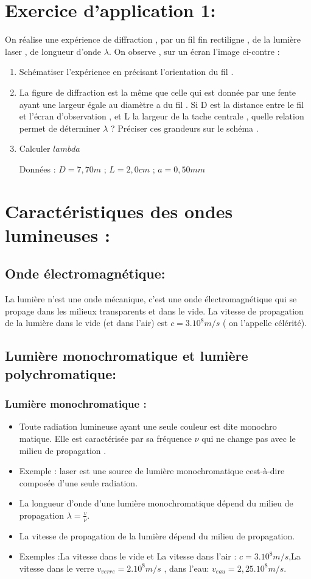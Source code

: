 \documentclass[12pt]{article}
\begin{document}
\section*{Exercice d'application 1: }
On réalise une expérience de diffraction , par un fil fin rectiligne , de la
lumière laser , de longueur d’onde $\lambda$. On observe , sur un écran l’image
ci-contre :
\begin{enumerate}
	\item Schématiser l’expérience en précisant l’orientation du fil .

	\item La figure de diffraction est la même que celle qui est donnée par une fente ayant une largeur égale au diamètre a du fil . Si D est la distance entre le fil et l’écran d’observation , et L la largeur de la tache centrale , quelle relation permet de déterminer $\lambda$ ? Préciser ces grandeurs sur le schéma .
 \item  Calculer $lambda$

Données : $D = 7,70m$ ; $L = 2,0cm$ ; $a = 0,50mm$
\end{enumerate}

\section{Caractéristiques des ondes lumineuses : }
\subsection{Onde électromagnétique:}
La lumière n’est une onde mécanique, c’est une onde électromagnétique qui se propage dans les milieux transparents et dans le vide.
La vitesse de propagation de la lumière dans le vide (et dans l’air) est $c = 3.10^8m/s$ ( on l’appelle célérité).
\subsection{Lumière monochromatique et lumière polychromatique: }
\subsubsection{Lumière monochromatique : }
\begin{itemize}
	\item Toute radiation lumineuse ayant une seule couleur est dite monochro matique. Elle est caractérisée par sa fréquence $\nu$ qui ne change
pas avec le milieu de propagation .

\item Exemple :  laser est une source de lumière monochromatique cest-à-dire composée d'une seule radiation.
\item La longueur d'onde d'une lumière monochromatique dépend du milieu de propagation  $\lambda=\frac{v}{\nu}$.

\item La vitesse de propagation de la lumière dépend du milieu de propagation.
\item Exemples :La vitesse dans le vide et La vitesse  dans l'air : $c=3.10^8m/s$,La vitesse dans le verre $v_{verre}=2.10^8m/s$ , dans l'eau: $v_{eau}=2,25.10^8m/s$.
\end{itemize}
\end{document}
